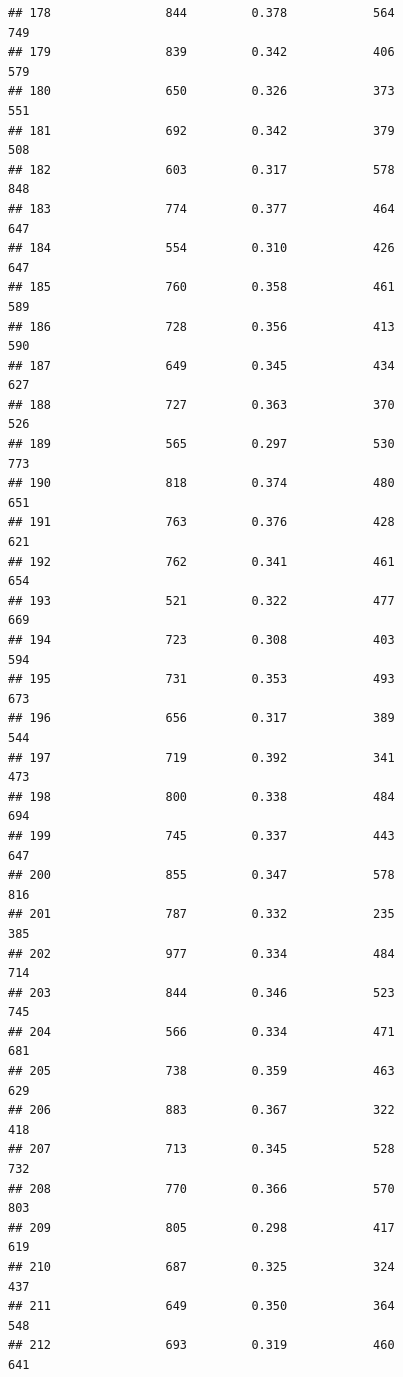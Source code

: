 \documentclass[]{book}
\begin{document}
\begin{verbatim}
## 178                844         0.378            564                 749
## 179                839         0.342            406                 579
## 180                650         0.326            373                 551
## 181                692         0.342            379                 508
## 182                603         0.317            578                 848
## 183                774         0.377            464                 647
## 184                554         0.310            426                 647
## 185                760         0.358            461                 589
## 186                728         0.356            413                 590
## 187                649         0.345            434                 627
## 188                727         0.363            370                 526
## 189                565         0.297            530                 773
## 190                818         0.374            480                 651
## 191                763         0.376            428                 621
## 192                762         0.341            461                 654
## 193                521         0.322            477                 669
## 194                723         0.308            403                 594
## 195                731         0.353            493                 673
## 196                656         0.317            389                 544
## 197                719         0.392            341                 473
## 198                800         0.338            484                 694
## 199                745         0.337            443                 647
## 200                855         0.347            578                 816
## 201                787         0.332            235                 385
## 202                977         0.334            484                 714
## 203                844         0.346            523                 745
## 204                566         0.334            471                 681
## 205                738         0.359            463                 629
## 206                883         0.367            322                 418
## 207                713         0.345            528                 732
## 208                770         0.366            570                 803
## 209                805         0.298            417                 619
## 210                687         0.325            324                 437
## 211                649         0.350            364                 548
## 212                693         0.319            460                 641

\end{verbatim}
\end{document}
